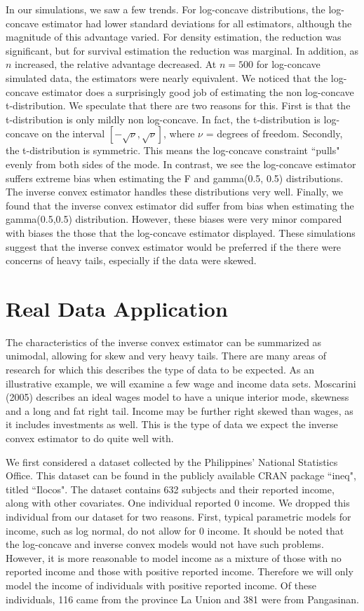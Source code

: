 \documentclass[11pt]{article}
\numberwithin{equation}{section}
\begin{document}
	
	In our simulations, we saw a few trends. For log-concave distributions, the log-concave estimator had lower standard deviations for all estimators, although the magnitude of this advantage varied. For density estimation, the reduction was significant, but for survival estimation the reduction was marginal. In addition, as $n$ increased, the relative advantage decreased. At $n = 500$ for log-concave simulated data, the estimators were nearly equivalent. We noticed that the log-concave estimator does a surprisingly good job of estimating the non log-concave t-distribution. We speculate that there are two reasons for this. First is that the t-distribution is only mildly non log-concave. In fact, the t-distribution is log-concave on the interval $[-\sqrt{\nu}, \sqrt{\nu}]$, where $\nu$ = degrees of freedom. Secondly, the t-distribution is symmetric. This means the log-concave constraint ``pulls" evenly from both sides of the mode. In contrast, we see the log-concave estimator suffers extreme bias when estimating the F and gamma(0.5, 0.5) distributions. The inverse convex estimator handles these distributions very well. Finally, we found that the inverse convex estimator did suffer from bias when estimating the gamma(0.5,0.5) distribution. However, these biases were very minor compared with biases the those that the log-concave estimator displayed. These simulations suggest that the inverse convex estimator would be preferred if the there were concerns of heavy tails, especially if the data were skewed.  

	
		
{\section{Real Data Application} }
	
	The characteristics of the inverse convex estimator can be summarized as unimodal, allowing for skew and very heavy tails. There are many areas of research for which this describes the type of data to be expected. As an illustrative example, we will examine a few wage and income data sets. Moscarini (2005) describes an ideal wages model to have a unique interior mode, skewness and a long and fat right tail. Income may be further right skewed than wages, as it includes investments as well. This is the type of data we expect the inverse convex estimator to do quite well with. 
	
	We first considered a dataset collected by the Philippines' National Statistics Office. This dataset can be found in the publicly available CRAN package ``ineq", titled ``Ilocos". The dataset contains 632 subjects and their reported income, along with other covariates. One individual reported 0 income. We dropped this individual from our dataset for two reasons. First, typical parametric models for income, such as log normal, do not allow for 0 income. It should be noted that the log-concave and inverse convex models would not have such problems. However, it is more reasonable to model income as a mixture of those with no reported income and those with positive reported income. Therefore we will only model the income of individuals with positive reported income. Of these individuals, 116 came from the province La Union and 381 were from Pangasinan. 
	
\end{document}
